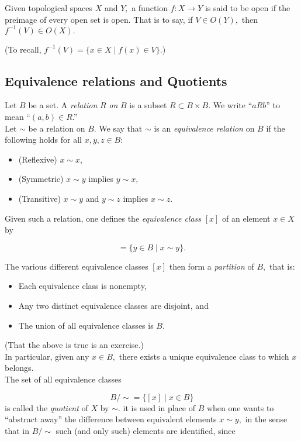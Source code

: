Given topological spaces $X$ and $Y,$ a function $f:X\to Y$ is said to be open if the preimage of every open set is open. That is to say, if $V \in O(Y),$ then $f^{-1}(V) \in O(X).$

(To recall, $f^{-1}(V) = \{x \in X \mid f(x) \in V\}.$)
%
\subsection{Equivalence relations and Quotients} \label{equivrel}
Let $B$ be a set. A \emph{relation} $R$ \emph{on} $B$ is a subset $R \subset B \times B.$ We write ``$aRb$'' to mean ``$(a, b) \in R$.''\\
Let ${\sim}$ be a relation on $B.$ We say that ${\sim}$ is an \emph{equivalence relation} on $B$ if the following holds for all $x, y, z \in B:$
\begin{itemize}
	\item (Reflexive) $x \sim x,$
	\item (Symmetric) $x \sim y$ implies $y \sim x,$
	\item (Transitive) $x \sim y$ and $y \sim z$ implies $x {\sim} z.$
\end{itemize}
Given such a relation, one defines the \emph{equivalence class} $[x]$ of an element $x \in X$ by

\begin{equation*} 
	[x] = \{y \in  B \mid x \sim y\}.
\end{equation*}

The various different equivalence classes $[x]$ then form a \emph{partition} of $B,$ that is:
\begin{itemize}
	\item Each equivalence class is nonempty,
	\item Any two distinct equivalence classes are disjoint, and
	\item The union of all equivalence classes is $B.$
\end{itemize}
(That the above is true is an exercise.)\\
In particular, given any $x \in B,$ there exists a unique equivalence class to which $x$ belongs.\\
The set of all equivalence classes

\begin{equation*} 
	B/{\sim} = \{[x] \mid x \in B\}
\end{equation*}
is called the \emph{quotient} of $X$ by ${\sim}.$ it is used in place of $B$ when one wants to ``abstract away'' the difference between equivalent elements $x \sim y,$ in the sense that in $B/{\sim}$ such (and only such) elements are identified, since

